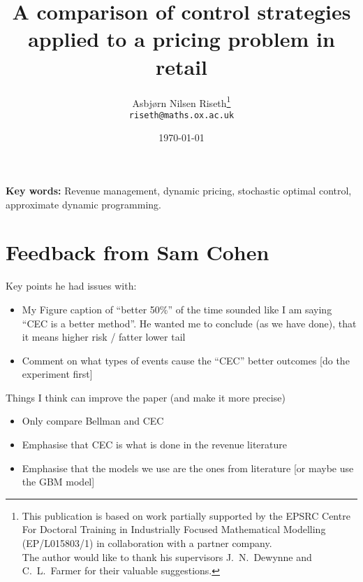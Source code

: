\documentclass[a4paper,12pt]{article}
\title{A comparison of control strategies applied to a
  pricing problem in retail}
\author{Asbj{\o}rn Nilsen Riseth\thanks{
    This publication is based on work partially supported by the EPSRC
    Centre For Doctoral Training in Industrially Focused Mathematical
    Modelling (EP/L015803/1) in collaboration with a partner
    company.\\
    The author would like to thank his supervisors
    J.~N.~Dewynne and C.~L.~Farmer for their valuable suggestions.}\\
  {\footnotesize\texttt{riseth@maths.ox.ac.uk}}}
\affil{Mathematical Institute, University
  of Oxford, OX2 6GG.}
\date{\today}
\def\biblio{}
\begin{document}
\maketitle
\listoftodos

\def\biblio{}
\def\listoftodos{}



\vspace{1em}\noindent
\textbf{Key words:} Revenue management, dynamic pricing, stochastic
optimal control,
approximate dynamic programming.

\section{Feedback from Sam Cohen}
Key points he had issues with:
\begin{itemize}
\item My Figure caption of ``better 50\%'' of the time sounded like I
  am saying ``CEC is a better method''. He wanted me to conclude (as
  we have done), that it means higher risk / fatter lower tail
\item Comment on what types of events cause the ``CEC'' better
  outcomes [do the experiment first]
\end{itemize}

Things I think can improve the paper (and make it more precise)
\begin{itemize}
\item Only compare Bellman and CEC
\item Emphasise that CEC is what is done in the revenue literature
\item Emphasise that the models we use are the ones from literature
  [or maybe use the GBM model]

\end{itemize}







\clearpage





\end{document}
